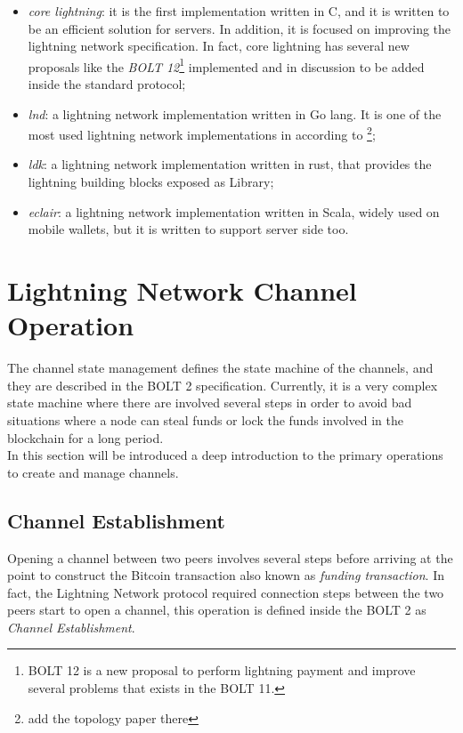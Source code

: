 \begin{itemize}
  \item \emph{core lightning}: it is the first implementation written in C, and it is written
        to be an efficient solution for servers. In addition, it is focused on improving the lightning network specification. In fact, core lightning has several new proposals like the \emph{BOLT 12}\footnote{BOLT 12 is a new proposal to perform
        lightning payment and improve several problems that exists in the BOLT 11.} implemented and in discussion to be
        added inside the standard protocol;
  \item \emph{lnd}: a lightning network implementation written in Go lang. It is one of the most used lightning network implementations in according to \footnote{add the topology paper there};
  \item \emph{ldk}: a lightning network implementation written in rust, that provides the lightning building blocks exposed as Library;
  \item \emph{eclair}: a lightning network implementation written in Scala, widely used on mobile wallets, but it is written to
        support server side too.
\end{itemize}

\section{Lightning Network Channel Operation}
\label{sec:channel_state}

The channel state management defines the state machine of the channels, and they are described in the BOLT 2 specification. Currently, it is a very complex
state machine where there are involved several steps in order to avoid bad
situations where a node can steal funds or lock the funds involved in the blockchain for a long period.\\
In this section will be introduced a deep introduction to the primary operations to create and manage channels.

\subsection{Channel Establishment}
\label{sec:open_a_channels}

Opening a channel between two peers involves several steps before arriving at the point to construct the Bitcoin transaction also
known as \emph{funding transaction}.
In fact, the Lightning Network protocol required connection steps between the two peers start to open a channel, this
operation is defined inside the BOLT 2\cite{bolt2} as \emph{Channel Establishment}.

